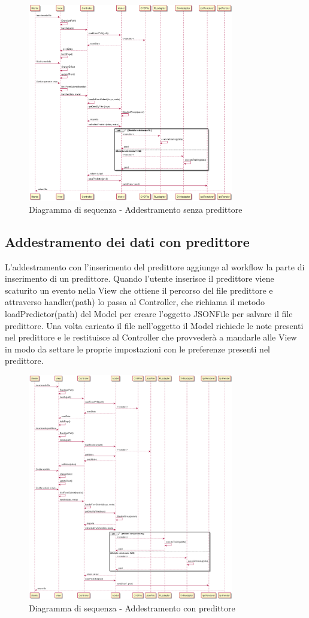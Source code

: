 \documentclass[../manuale-sviluppatore.tex]{subfiles}
\begin{document}
\begin{figure}[H]
    \begin{center}
         \includegraphics[width=9cm]{img/sequenceDiagramNoP.png}
         \caption{Diagramma di sequenza - Addestramento senza predittore}
         \label{fig:diagramma_di_sequenza}
     \end{center}
 \end{figure}

\subsection{Addestramento dei dati con predittore}
\label{ssec:addestramento_dati_con_predittore}
L'addestramento con l'inserimento del predittore aggiunge al workflow la parte di inserimento di un predittore.
Quando l'utente inserisce il predittore viene scaturito un evento nella View che ottiene il percorso del file predittore e attraverso handler(path) lo passa al Controller,
che richiama il metodo loadPredictor(path) del Model per creare l'oggetto JSONFile per salvare il file predittore.
Una volta caricato il file nell'oggetto il Model richiede le note presenti nel predittore e le restituisce al Controller che provvederà a mandarle alle View in modo da settare le proprie impostazioni con le preferenze presenti nel predittore.

\begin{figure}[H]
    \begin{center}
         \includegraphics[width=9cm]{img/sequenceDiagramConP.png}
         \caption{Diagramma di sequenza - Addestramento con predittore}
         \label{fig:daa}
     \end{center}
 \end{figure}
\end{document}
